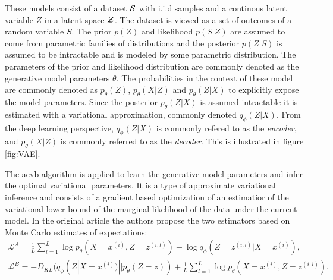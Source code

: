 These models consist of a dataset $\mathcal{S}$ with i.i.d samples and a continous latent variable $Z$ in a latent space $\mathcal{Z}$. The dataset is viewed as a set of outcomes of a random variable $S$. The prior $p(Z)$ and likelihood $p(S|Z)$ are assumed to come from parametric families of distributions and the posterior $p(Z|S)$ is assumed to be intractable and is modeled by some parametric distribution. The parameters of the prior and likelihood distribution are commonly denoted as the generative model parameters $\theta$. The probabilities in the context of these model are commonly denoted as $p_\theta(Z)$, $p_\theta(X|Z)$ and $p_\theta(Z|X)$ to explicitly expose the model parameters. Since the posterior $p_\theta(Z|X)$ is assumed intractable it is estimated with a variational approximation, commonly denoted $q_\phi(Z|X)$. From the deep learning perspective, $q_\phi(Z|X)$ is commonly refered to as the \textit{encoder}, and $p_\theta(X|Z)$ is commonly referred to as the \textit{decoder}. This is illustrated in figure \ref{fig:VAE}.

The \acrshort{aevb} algorithm is applied to learn the generative model parameters and infer the optimal variational parameters. It is a type of approximate variational inference and consists of a gradient based optimization of an estimatior of the variational lower bound of the marginal likelihood of the data under the current model. In the original article the authors propose the two estimators based on Monte Carlo estimates of expectations:
\begin{equation}
    \label{eq:VAEstimators}
    \begin{aligned}
        \mathcal{L}^A = \frac{1}{L}\sum_{l=1}^L \log p_\theta (X=x^{(i)},Z=z^{(i, l)}) - \log q_\phi (Z=z^{(i, l)} | X=x^{(i)}) , \\
        \mathcal{L}^B = - D_{KL}(q_\phi (Z | X=x^{(i)}) || p_\theta(Z=z)) + \frac{1}{L}\sum_{l=1}^L \log p_\theta (X=x^{(i)},Z=z^{(i, l)}).
    \end{aligned}
\end{equation}

